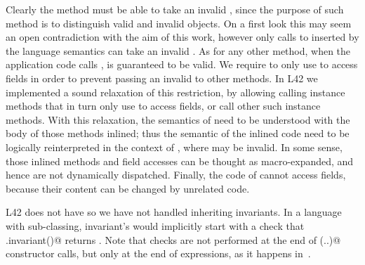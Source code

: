 Clearly the \Q@invariant@ method must be able to take an invalid \Q@this@, since the purpose of such method is to distinguish valid and invalid objects.
On a first look this may seem an open contradiction
with the aim of this work, however only calls to \Q@invariant@ inserted by the language semantics can take an invalid \Q@this@. As for any other method, when the application code calls \Q@invariant@,
\Q@this@ is guaranteed to be valid.
We require \Q@invariant@
to only use \Q@this@ to access fields 
in order to prevent passing an invalid \Q@this@ to other methods.
In L42 we implemented a sound relaxation of this restriction, by allowing calling instance methods that in turn only use \Q@this@ to access fields, or call other such instance methods. With this relaxation, the semantics of \Q@invariant@ need to be understood with the body of those methods inlined; thus the semantic of the inlined code need to be logically reinterpreted in the context of \Q@invariant@, where \Q@this@ may be invalid.
In some sense, those inlined methods and field accesses can be thought as macro-expanded, and hence are not dynamically dispatched.
Finally,
the code of \Q@invariant@ cannot access \Q@mut@ fields, because their content can be changed by unrelated code.



L42 does not have \Q@extends@ so we have not handled inheriting invariants.
In a language with sub-classing, invariant's would implicitly start with a check that \Q@super.invariant()@ returns \Q@true@.
Note that \Q@invariant@ checks are not performed at the end of \Q@super(..)@ constructor calls, but only at the end of \Q@new@ expressions, as it happens in~\cite{JOSE}.




